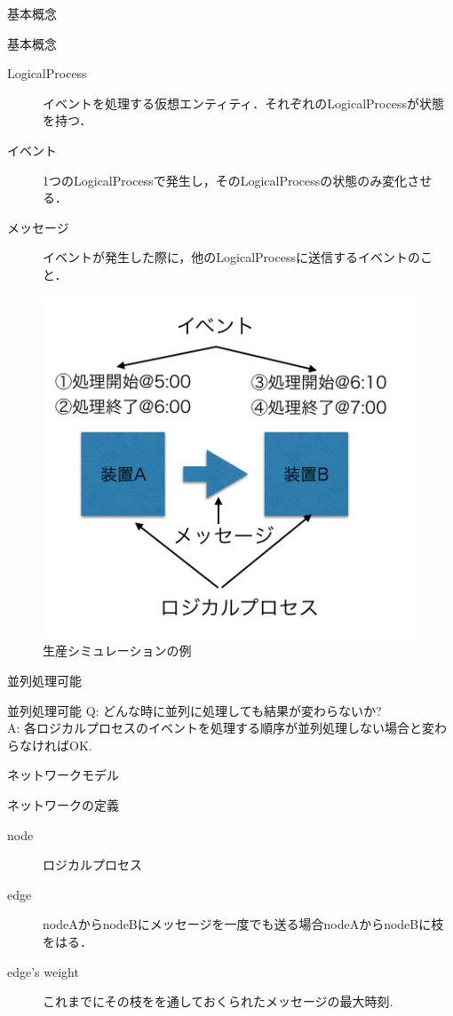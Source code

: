 \documentclass[dvipdfmx,uplatex,11pt]{beamer}
\theoremstyle{definition}
\begin{document}
\begin{frame}{基本概念}
  \begin{block}{基本概念}
    \small
    \begin{description}
      \item[LogicalProcess] イベントを処理する仮想エンティティ．それぞれのLogicalProcessが状態を持つ．
      \item[イベント] 1つのLogicalProcessで発生し，そのLogicalProcessの状態のみ変化させる．
      \item[メッセージ] イベントが発生した際に，他のLogicalProcessに送信するイベントのこと．
    \end{description}
  \end{block}
  \begin{figure}
    \includegraphics[scale=0.2]{basic_idea.png}
    \caption{生産シミュレーションの例}
  \end{figure}
\end{frame}


\begin{frame}{並列処理可能}
  \begin{block}{並列処理可能}
  Q: どんな時に並列に処理しても結果が変わらないか? \\
  A: 各ロジカルプロセスのイベントを処理する順序が並列処理しない場合と変わらなければOK.
  \end{block}
\end{frame}

\begin{frame}{ネットワークモデル}
  \begin{block}{ネットワークの定義}
    \begin{description}
      \item[node] ロジカルプロセス
      \item[edge] nodeAからnodeBにメッセージを一度でも送る場合nodeAからnodeBに枝をはる．
      \item[edge's weight] これまでにその枝をを通しておくられたメッセージの最大時刻.
    \end{description}

  \end{block}
\end{frame}
\end{document}
